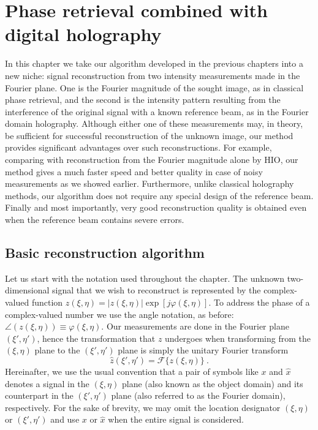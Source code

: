 \chapter{Phase retrieval combined with digital
  holography\footnotemark{}}
\label{cha:phase-retr-holography}


In this chapter we take our algorithm developed in the previous
chapters into a new niche: signal reconstruction from two intensity
measurements made in the Fourier plane. One is the Fourier magnitude
of the sought image, as in classical phase retrieval, and the second
is the intensity pattern resulting from the interference of the
original signal with a known reference beam, as in the Fourier domain
holography. Although either one of these measurements may, in theory,
be sufficient for successful reconstruction of the unknown image, our
method provides significant advantages over such reconstructions. For
example, comparing with reconstruction from the Fourier magnitude
alone by HIO, our method gives a much faster speed and better quality
in case of noisy measurements as we showed earlier. Furthermore,
unlike classical holography methods, our algorithm does not require
any special design of the reference beam. Finally and most
importantly, very good reconstruction quality is obtained even when
the reference beam contains severe errors.


\section{Basic reconstruction algorithm}
\label{sec:basic-reconstr-algor} Let us start with the notation used
throughout the chapter. The unknown two-dimensional signal that we wish
to reconstruct is represented by the complex-valued function
$z(\xi,\eta)=|z(\xi,\eta)|\exp[j\varphi(\xi,\eta)]$. To address the
phase of a complex-valued number we use the angle notation, as before:
$\angle(z(\xi,\eta)) \equiv \varphi(\xi,\eta)$. Our measurements are
done in the Fourier plane $(\xi',\eta')$, hence the transformation
that $z$ undergoes when transforming from the $(\xi,\eta)$ plane to
the $(\xi',\eta')$ plane is simply the unitary Fourier transform
\begin{equation}
  \label{eq:phase-holo-1}
  \hat{z}(\xi',\eta') = \mathcal{F}\{z(\xi,\eta)\}\ .
\end{equation}
Hereinafter, we use  the
usual convention that a pair of symbols like $x$ and $\hat{x}$ denotes a
signal in the $(\xi,\eta)$ plane (also known as the object domain) and
its counterpart in the $(\xi',\eta')$ plane (also referred to as the
Fourier domain), respectively. For the sake of brevity, we may
omit the location designator $(\xi,\eta)$  or $(\xi',\eta')$ and use $x$
or $\hat{x}$ when the entire signal is considered.

